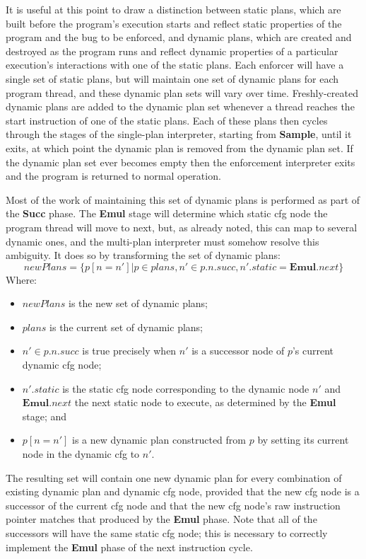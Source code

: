 It is useful at this point to draw a distinction between static plans,
which are built before the program's execution starts and reflect
static properties of the program and the bug to be enforced, and
dynamic plans, which are created and destroyed as the program runs and
reflect dynamic properties of a particular execution's interactions
with one of the static plans.  Each enforcer will have a single set of
static plans, but will maintain one set of dynamic plans for each
program thread, and these dynamic plan sets will vary over time.
Freshly-created dynamic plans are added to the dynamic plan set
whenever a thread reaches the start instruction of one of the static
plans.  Each of these plans then cycles through the stages of the
single-plan interpreter, starting from \textbf{Sample}, until it
exits, at which point the dynamic plan is removed from the dynamic
plan set.  If the dynamic plan set ever becomes empty then the
enforcement interpreter exits and the program is returned to normal
operation.

Most of the work of maintaining this set of dynamic plans is performed
as part of the \textbf{Succ} phase.  The \textbf{Emul} stage will
determine which \gls{static cfg} node the program thread will move to
next, but, as already noted, this can map to several dynamic ones, and
the multi-plan interpreter must somehow resolve this ambiguity.  It
does so by transforming the set of dynamic plans: 
\begin{displaymath}
\mathit{newPlans} = \{p[n = n'] | p \in \mathit{plans}, n' \in p.n.\mathit{succ}, n'\!.\mathit{static} = \mathbf{Emul}.\mathit{next} \}
\end{displaymath}
Where:
\begin{itemize}
\item $\mathit{newPlans}$ is the new set of dynamic plans;
\item $\mathit{plans}$ is the current set of dynamic plans;
\item $n' \in p.n.\mathit{succ}$ is true precisely when $n'$ is a
  successor node of $p$'s current \gls{dynamic cfg} node;
\item $n'\!.\mathit{static}$ is the \gls{static cfg} node
  corresponding to the dynamic node $n'$ and
  $\mathbf{Emul}.\mathit{next}$ the next static node to execute, as
  determined by the \textbf{Emul} stage; and
\item $p[n = n']$ is a new dynamic plan constructed from $p$ by
  setting its current node in the \gls{dynamic cfg} to $n'$.
\end{itemize}
The resulting set will contain one new dynamic plan for every
combination of existing dynamic plan and \gls{dynamic cfg} node,
provided that the new \gls{cfg} node is a successor of the current
\gls{cfg} node and that the new \gls{cfg} node's raw instruction
pointer matches that produced by the \textbf{Emul} phase.  Note that
all of the successors will have the same \gls{static cfg} node; this
is necessary to correctly implement the \textbf{Emul} phase of the
next instruction cycle.

